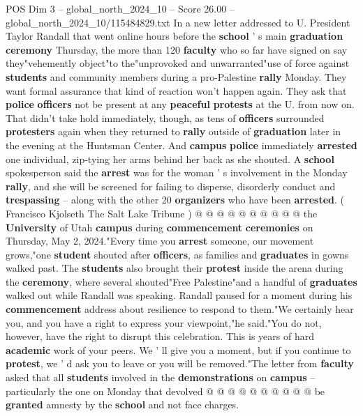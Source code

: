 \begin{textsample}{POS Dim 3 – global\_north\_2024\_10 – Score 26.00 – global\_north\_2024\_10/115484829.txt}  \label{ex:f3_pos_122}
In a new letter addressed to U.
President Taylor Randall that went online hours before the \textbf{school} ' s main \textbf{graduation} \textbf{ceremony} Thursday, the more than 120 \textbf{faculty} who so far have signed on say they"vehemently object"to the"unprovoked and unwarranted"use of force against \textbf{students} and community members during a pro-Palestine \textbf{rally} Monday.
They want formal assurance that kind of reaction won't happen again.
They ask that \textbf{police} \textbf{officers} not be present at any \textbf{peaceful} \textbf{protests} at the U. from now on.
That didn't take hold immediately, though, as tens of \textbf{officers} surrounded \textbf{protesters} again when they returned to \textbf{rally} outside of \textbf{graduation} later in the evening at the Huntsman Center.
And \textbf{campus} \textbf{police} immediately \textbf{arrested} one individual, zip-tying her arms behind her back as she shouted.
A \textbf{school} spokesperson said the \textbf{arrest} was for the woman ' s involvement in the Monday \textbf{rally}, and she will be screened for failing to disperse, disorderly conduct and \textbf{trespassing} -- along with the other 20 \textbf{organizers} who have been \textbf{arrested}. ( Francisco Kjolseth The Salt Lake Tribune ) @ @ @ @ @ @ @ @ @ @ the \textbf{University} of Utah \textbf{campus} during \textbf{commencement} \textbf{ceremonies} on Thursday, May 2, 2024."Every time you \textbf{arrest} someone, our movement grows,"one \textbf{student} shouted after \textbf{officers}, as families and \textbf{graduates} in gowns walked past.
The \textbf{students} also brought their \textbf{protest} inside the arena during the \textbf{ceremony}, where several shouted"Free Palestine"and a handful of \textbf{graduates} walked out while Randall was speaking.
Randall paused for a moment during his \textbf{commencement} address about resilience to respond to them."We certainly hear you, and you have a right to express your viewpoint,"he said."You do not, however, have the right to disrupt this celebration.
This is years of hard \textbf{academic} work of your peers.
We ' ll give you a moment, but if you continue to \textbf{protest}, we ' d ask you to leave or you will be removed."The letter from \textbf{faculty} asked that all \textbf{students} involved in the \textbf{demonstrations} on \textbf{campus} -- particularly the one on Monday that devolved @ @ @ @ @ @ @ @ @ @ be \textbf{granted} amnesty by the \textbf{school} and not face charges.

\end{textsample}
